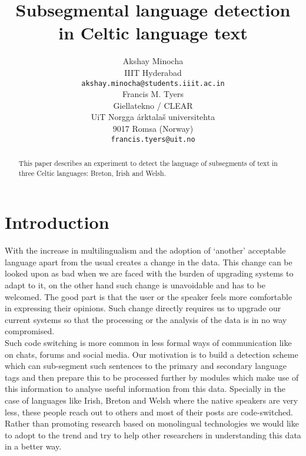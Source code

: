\documentclass[11pt]{article}
\title{Subsegmental language detection in Celtic language text}
\author{Akshay Minocha \\
  IIIT Hyderabad  \\
  {\tt akshay.minocha@students.iiit.ac.in} \\\And
  Francis M. Tyers \\
  Giellatekno / CLEAR \\
  UiT Norgga \'arktala\v{s} universitehta  \\
  9017 Romsa (Norway) \\
  {\tt francis.tyers@uit.no} \\}
\date{}
\begin{document}
\maketitle
\begin{abstract}
  This paper describes an experiment to detect the language of subsegments
  of text in three Celtic languages: Breton, Irish and Welsh. 
\end{abstract}

\section{Introduction}
\label{intro}
With the increase in multilingualism and the adoption of ‘another’ acceptable language apart from the usual creates a change in the data. This change can be looked upon as bad when we are faced with the burden of upgrading systems to adapt to it, on the other hand such change is 
unavoidable and has to be welcomed. The good part is that the user or the speaker feels more comfortable in expressing their opinions. Such change directly requires us to upgrade our current systems \cite{fung2008multilingual} so that the processing or the analysis of the data is in no way compromised.\\
   Such code switching is more common in less formal ways of communication like on chats, forums and social media. Our motivation is to build a detection scheme which can sub-segment such sentences to the primary and secondary language tags and then prepare this to be processed further by modules which make use of this information to analyse useful information from this data. Specially in the case of languages like Irish, Breton and Welsh where the native speakers are very less, these people reach out to others and most of their posts are code-switched. Rather than promoting research based on monolingual technologies we would like to adopt to the trend and try to help other researchers in understanding this data in a better way.
\cite{lyu2006}
\end{document}
